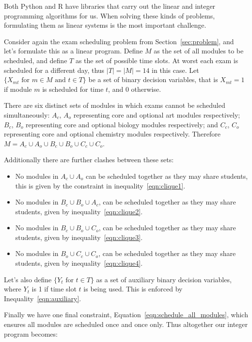 Both Python and R have libraries that carry out the linear and integer
programming algorithms for us. When solving these kinds of problems, formulating
them as linear systems is the most important challenge.

Consider again the exam scheduling problem from Section~\ref{sec:problem}, and
let's formulate this as a linear program.
Define $M$ as the set of all modules to be scheduled, and define $T$ as the set
of possible time slots. At worst each exam is
scheduled for a different day, thus $|T| = |M| = 14$ in this case.
Let $\{X_{mt} \text{ for } m \in M \text{ and } t \in T\}$ be a set of binary
decision variables, that is $X_{mt} = 1$ if module $m$ is scheduled for time
$t$, and $0$ otherwise.

There are six distinct sets of modules in which exams cannot be scheduled
simultaneously: $A_c$, $A_o$ representing core and optional art modules
respectively; $B_c$, $B_o$ representing core and optional biology modules
respectively; and $C_c$, $C_o$ representing core and optional chemistry modules
respectively.
Therefore $M = A_c \cup A_o \cup B_c \cup B_o \cup C_c \cup C_o$.

Additionally there are further clashes between these sets:
\begin{itemize}
  \item No modules in $A_c \cup A_o$ can be scheduled together as they may
  share students, this is given by the constraint in inequality~\ref{eqn:clique1}.
  \item No modules in $B_c \cup B_o \cup A_c$, can be scheduled together as
  they may share students, given by inequality~\ref{eqn:clique2}.
  \item No modules in $B_c \cup B_o \cup C_o$, can be scheduled together as
  they may share students, given by inequality~\ref{eqn:clique3}.
  \item No modules in $B_o \cup C_c \cup C_o$, can be scheduled together as
  they may share students, given by inequality~\ref{eqn:clique4}.
\end{itemize}

Let's also define $\{Y_t \text{ for } t \in T\}$ as a set of auxiliary binary
decision variables, where $Y_t$ is 1 if time slot $t$ is being used. This is
enforced by Inequality~\ref{eqn:auxiliary}.

Finally we have one final constraint, Equation~\ref{eqn:schedule_all_modules},
which ensures all modules are scheduled once and once only.
Thus altogether our integer program becomes:

